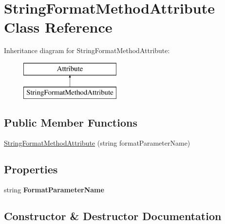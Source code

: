 \hypertarget{class_string_format_method_attribute}{}\section{String\+Format\+Method\+Attribute Class Reference}
\label{class_string_format_method_attribute}
Inheritance diagram for String\+Format\+Method\+Attribute\+:\begin{figure}[H]
\begin{center}
\leavevmode
\includegraphics[height=2.000000cm]{class_string_format_method_attribute}
\end{center}
\end{figure}
\subsection*{Public Member Functions}
\begin{DoxyCompactItemize}
\item 
\hyperlink{class_string_format_method_attribute_a39256792ebf736db384513a1e9d88240}{String\+Format\+Method\+Attribute} (string format\+Parameter\+Name)
\end{DoxyCompactItemize}
\subsection*{Properties}
\begin{DoxyCompactItemize}
\item 
\hypertarget{class_string_format_method_attribute_a93e8904b7dfa6cdd20798a5ae4d3423e}{}string {\bfseries Format\+Parameter\+Name}\label{class_string_format_method_attribute_a93e8904b7dfa6cdd20798a5ae4d3423e}

\end{DoxyCompactItemize}


\subsection{Constructor \& Destructor Documentation}
\hypertarget{class_string_format_method_attribute_a39256792ebf736db384513a1e9d88240}{}
